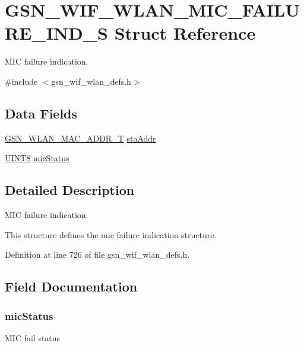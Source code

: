 \hypertarget{a00391}{
\section{GSN\_\-WIF\_\-WLAN\_\-MIC\_\-FAILURE\_\-IND\_\-S Struct Reference}
\label{a00391}
}


MIC failure indication.  




{\ttfamily \#include $<$gsn\_\-wif\_\-wlan\_\-defs.h$>$}

\subsection*{Data Fields}
\begin{DoxyCompactItemize}
\item 
\hyperlink{a00416}{GSN\_\-WLAN\_\-MAC\_\-ADDR\_\-T} \hyperlink{a00391_a3ca54ba7eb6c301c5b6584284a9ccb8b}{staAddr}
\item 
\hyperlink{a00660_gab27e9918b538ce9d8ca692479b375b6a}{UINT8} \hyperlink{a00391_aa6a7edbffa5740cc0e123fce52745233}{micStatus}
\end{DoxyCompactItemize}


\subsection{Detailed Description}
MIC failure indication. 

This structure defines the mic failure indication structure. 

Definition at line 726 of file gsn\_\-wif\_\-wlan\_\-defs.h.



\subsection{Field Documentation}
\hypertarget{a00391_aa6a7edbffa5740cc0e123fce52745233}{
\subsubsection[{micStatus}]{ {\bf micStatus}}}
\label{a00391_aa6a7edbffa5740cc0e123fce52745233}
MIC fail status 

